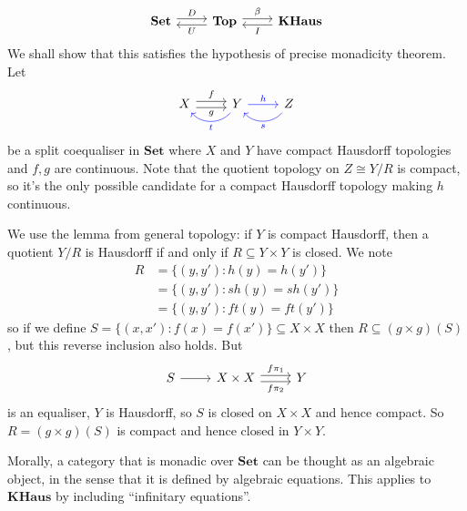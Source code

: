 \documentclass[a4paper]{article}
\renewcommand{\c}[1]{\mathbf{#1}}
\newcommand{\Set}{{\c{Set}}}
\newcommand{\Top}{{\c{Top}}}
\begin{document}
\begin{eg}
\begin{enumerate}
    \[
      \begin{tikzcd}
        \Set \ar[r, shift left, "D"] & \Top \ar[l, shift left, "U"] \ar[r, shift left, "\beta"] & \c{KHaus} \ar[l, shift left, "I"]
      \end{tikzcd}
    \]
    We shall show that this satisfies the hypothesis of precise monadicity theorem. Let
    \[
      \begin{tikzcd}
        X \ar[r, shift left, "f"] \ar[r, shift right, "g"'] & Y \ar[l, bend left=50, blue, "t"] \ar[r, blue, "h"] & Z \ar[l, bend left=50, blue, "s"]
      \end{tikzcd}
    \]
    be a split coequaliser in \(\Set\) where \(X\) and \(Y\) have compact Hausdorff topologies and \(f, g\) are continuous. Note that the quotient topology on \(Z \cong Y/R\) is compact, so it's the only possible candidate for a compact Hausdorff topology making \(h\) continuous.

    We use the lemma from general topology: if \(Y\) is compact Hausdorff, then a quotient \(Y/R\) is Hausdorff if and only if \(R \subseteq Y \times Y\) is closed. We note
    \begin{align*}
      R
      &= \{(y, y'): h(y) = h(y')\} \\
      &= \{(y, y'): sh(y) = sh(y')\} \\
      &= \{(y, y'): ft(y) = ft(y')\}
    \end{align*}
    so if we define \(S = \{(x, x'): f(x) = f(x')\} \subseteq X \times X\) then \(R \subseteq (g \times g)(S)\), but this reverse inclusion also holds. But
    \[
      \begin{tikzcd}
        S \ar[r] & X \times X \ar[r, shift left, "f\pi_1"] \ar[r, shift right, "f\pi_2"'] & Y
      \end{tikzcd}
    \]
    is an equaliser, \(Y\) is Hausdorff, so \(S\) is closed on \(X \times X\) and hence compact. So \(R = (g \times g)(S)\) is compact and hence closed in \(Y \times Y\).

    Morally, a category that is monadic over \(\Set\) can be thought as an algebraic object, in the sense that it is defined by algebraic equations. This applies to \(\c{KHaus}\) by including ``infinitary equations''.
  \end{enumerate}
\end{eg}
\end{document}
